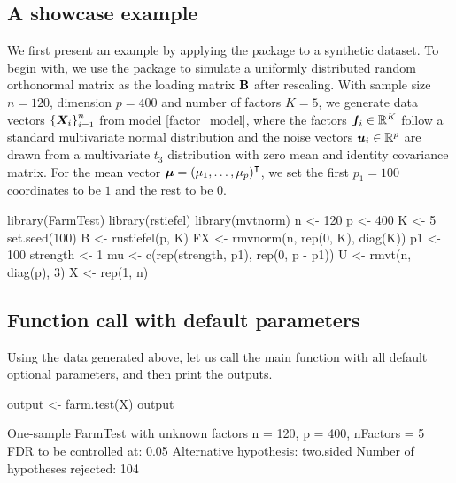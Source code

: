 



\subsection{A showcase example}\label{sec:data_generate}

We first present an example by applying the package to a synthetic dataset.
To begin with, we use the  package \citep{H2012} to simulate a uniformly distributed random orthonormal matrix as the loading matrix $\mathbf{B}$ after rescaling. With sample size $n = 120$, dimension $p = 400$ and number of factors $K = 5$, we generate data vectors $\left\{\bm{X}_i\right\}_{i = 1}^{n}$ from model \eqref{factor_model}, where the factors $\bm f_i \in \mathbb{R}^K$ follow a standard multivariate normal distribution and the noise vectors $ \bm{u}_i \in \mathbb{R}^p $ are drawn from a multivariate $t_3$ distribution with zero mean and identity covariance matrix. For the mean vector $\bm{\mu} = \left(\mu_1, \ldots, \mu_p\right)^\intercal$, we set the first $p_1=100$ coordinates to be  $1$ and the rest to be $0$.
\begin{example*}
library(FarmTest)
library(rstiefel)
library(mvtnorm)
n <- 120
p <- 400
K <- 5
set.seed(100)
B <- rustiefel(p, K) %
FX <- rmvnorm(n, rep(0, K), diag(K))
p1 <- 100
strength <- 1
mu <- c(rep(strength, p1), rep(0, p - p1))
U <- rmvt(n, diag(p), 3)
X <- rep(1, n) %
\end{example*}



\subsection{Function call with default parameters} \label{demo1}
Using the data generated above, let us call the main function  with all default optional parameters, and then print the outputs.
\begin{example*}
output <- farm.test(X)
output

One-sample FarmTest with unknown factors
n = 120, p = 400, nFactors = 5
FDR to be controlled at: 0.05
Alternative hypothesis: two.sided
Number of hypotheses rejected: 104
\end{example*}

